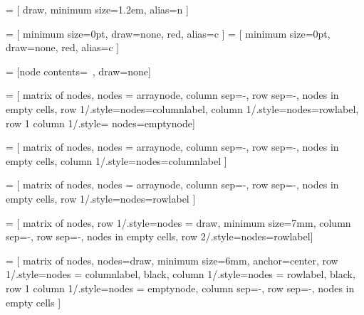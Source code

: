 
 = [
        draw,
        minimum size=1.2em,
        alias=n\the\numexpr{}\relax\the\numexpr{}\relax
        ]

 = [
        minimum size=0pt,
        draw=none,
        red,
        alias=c\the\numexpr{}\relax
        ]
 = [
        minimum size=0pt,
        draw=none,
        red,
        alias=c\the\numexpr{}\relax
        ]

 = [node contents=~, draw=none]

 = [%
        matrix of nodes,
        nodes = arraynode,
        column sep=-\pgflinewidth,
        row sep=-\pgflinewidth,
        nodes in empty cells,
        row 1/.style={nodes=columnlabel},
        column 1/.style={nodes=rowlabel},
        row 1 column 1/.style={%
            nodes=emptynode}]

 = [
        matrix of nodes,
        nodes = arraynode,
        column sep=-\pgflinewidth,
        row sep=-\pgflinewidth,
        nodes in empty cells,
        column 1/.style={nodes=columnlabel}
        ]

 = [
        matrix of nodes,
        nodes = arraynode,
        column sep=-\pgflinewidth,
        row sep=-\pgflinewidth,
        nodes in empty cells,
        row 1/.style={nodes=rowlabel}
          ]

 = [%
        matrix of nodes,
        row 1/.style={nodes = {draw, minimum size=7mm}},
        column sep=-\pgflinewidth,
        row sep=-\pgflinewidth,
        nodes in empty cells,
        row 2/.style={nodes=rowlabel}]

 = [%
        matrix of nodes,
        nodes={draw, minimum size=6mm, anchor=center},
        row 1/.style={nodes = {columnlabel, black}},
        column 1/.style={nodes = {rowlabel, black}},
        row 1 column 1/.style={nodes = emptynode},
        column sep=-\pgflinewidth,
        row sep=-\pgflinewidth,
        nodes in empty cells
]

